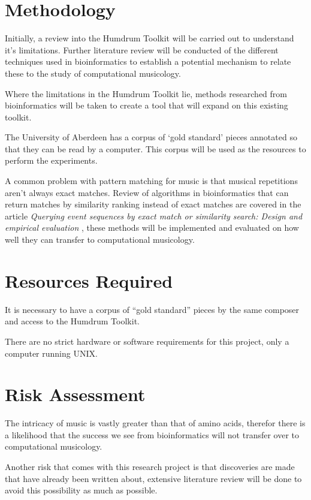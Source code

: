 \documentclass[a4paper,12pt]{article}
\begin{document}
  \section{Methodology}
    Initially, a review into the Humdrum Toolkit \cite{humdrum} will be carried out to understand it's limitations. Further literature review will be conducted of the different techniques used in bioinformatics to establish a potential mechanism to relate these to the study of computational musicology.  
    
    Where the limitations in the Humdrum Toolkit lie, methods researched from bioinformatics will be taken to create a tool that will expand on this existing toolkit. 

    The University of Aberdeen has a corpus of ‘gold standard’ pieces annotated so that they can be read by a computer.  This corpus will be used as the resources to perform the experiments.  
    
    A common problem with pattern matching for music is that musical repetitions aren't always exact matches. Review of algorithms in bioinformatics that can return matches by similarity ranking instead of exact matches are covered in the article \textit{Querying event sequences by exact match or similarity search: Design and empirical evaluation} \cite{wongsuphasawat2012querying}, these methods will be implemented and evaluated on how well they can transfer to computational musicology.
    
  \section{Resources Required}
    It is necessary to have a corpus of “gold standard” pieces by the same composer and access to the Humdrum Toolkit.
  
    There are no strict hardware or software requirements for this project, only a computer running UNIX.

  \section{Risk Assessment}
    The intricacy of music is vastly greater than that of amino acids, therefor there is a likelihood that the success we see from bioinformatics will not transfer over to computational musicology.
  
    Another risk that comes with this research project is that discoveries are made that have already been written about, extensive literature review will be done to avoid this possibility as much as possible.
    
\end{document}
